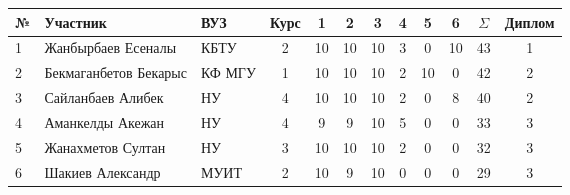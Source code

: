 \begin{center}
\begin{tabular}{|l|l|l|c|c|c|c|c|c|c|c|c|}
\hline
№ & Участник & ВУЗ & Курс & 1 & 2 & 3 & 4 & 5 & 6 & $\Sigma$ & Диплом \\
\hline
1 & Жанбырбаев Есеналы & КБТУ & 2 & 10 & 10 & 10 & 3 & 0 & 10 & 43 & 1  \\
\hline
2 & Бекмаганбетов Бекарыс & КФ МГУ & 1 & 10 & 10 & 10 & 2 & 10 & 0 & 42 & 2  \\
\hline
3 & Сайланбаев Алибек & НУ & 4 & 10 & 10 & 10 & 2 & 0 & 8 & 40 & 2  \\
\hline
4 & Аманкелды Акежан & НУ & 4 & 9 & 9 & 10 & 5 & 0 & 0 & 33 & 3  \\
\hline
5 & Жанахметов Султан & НУ & 3 & 10 & 10 & 10 & 2 & 0 & 0 & 32 & 3  \\
\hline
6 & Шакиев Александр & МУИТ & 2 & 10 & 9 & 10 & 0 & 0 & 0 & 29 & 3  \\
\hline
\end{tabular}
\end{center}